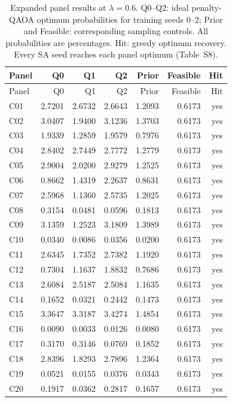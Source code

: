 \begingroup
\small
\setlength{\tabcolsep}{4pt}
\begin{longtable}{lrrrrrr}
\caption{Expanded panel results at $\lambda=0.6$. Q0--Q2: ideal penalty-QAOA optimum probabilities for training seeds 0--2; Prior and Feasible: corresponding sampling controls. All probabilities are percentages. Hit: greedy optimum recovery. Every SA seed reaches each panel optimum (Table~S8).}\\
\toprule
Panel & Q0 & Q1 & Q2 & Prior & Feasible & Hit\\
\midrule
\endfirsthead
\toprule
Panel & Q0 & Q1 & Q2 & Prior & Feasible & Hit\\
\midrule
\endhead
C01 & 2.7201 & 2.6732 & 2.6643 & 1.2093 & 0.6173 & yes \\
C02 & 3.0407 & 1.9400 & 3.1236 & 1.3703 & 0.6173 & yes \\
C03 & 1.9339 & 1.2859 & 1.9579 & 0.7976 & 0.6173 & yes \\
C04 & 2.8402 & 2.7449 & 2.7772 & 1.2779 & 0.6173 & yes \\
C05 & 2.9004 & 2.0200 & 2.9279 & 1.2525 & 0.6173 & yes \\
C06 & 0.8662 & 1.4319 & 2.2637 & 0.8631 & 0.6173 & yes \\
C07 & 2.5968 & 1.1360 & 2.5735 & 1.2025 & 0.6173 & yes \\
C08 & 0.3154 & 0.0481 & 0.0596 & 0.1813 & 0.6173 & yes \\
C09 & 3.1359 & 1.2523 & 3.1809 & 1.3989 & 0.6173 & yes \\
C10 & 0.0340 & 0.0086 & 0.0356 & 0.0200 & 0.6173 & yes \\
C11 & 2.6345 & 1.7352 & 2.7382 & 1.1920 & 0.6173 & yes \\
C12 & 0.7304 & 1.1637 & 1.8832 & 0.7686 & 0.6173 & yes \\
C13 & 2.6084 & 2.5187 & 2.5084 & 1.1635 & 0.6173 & yes \\
C14 & 0.1652 & 0.0321 & 0.2442 & 0.1473 & 0.6173 & yes \\
C15 & 3.3647 & 3.3187 & 3.4274 & 1.4854 & 0.6173 & yes \\
C16 & 0.0090 & 0.0033 & 0.0126 & 0.0080 & 0.6173 & yes \\
C17 & 0.3170 & 0.3146 & 0.0769 & 0.1852 & 0.6173 & yes \\
C18 & 2.8396 & 1.8293 & 2.7896 & 1.2364 & 0.6173 & yes \\
C19 & 0.0521 & 0.0155 & 0.0376 & 0.0343 & 0.6173 & yes \\
C20 & 0.1917 & 0.0362 & 0.2817 & 0.1657 & 0.6173 & yes \\

\end{longtable}
